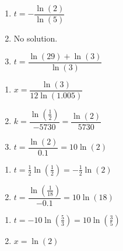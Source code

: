 \documentclass{ximera}
\begin{document}
\begin{multicols}{3}
\begin{enumerate}
\setcounter{enumi}{\value{HW}}

\item $t = -\dfrac{\ln(2)}{\ln(5)}$
\item No solution. 
\item $t = \dfrac{\ln(29) + \ln(3)}{\ln(3)}$

\setcounter{HW}{\value{enumi}}
\end{enumerate}
\end{multicols}

\begin{multicols}{3}
\begin{enumerate}
\setcounter{enumi}{\value{HW}}

\item $x = \dfrac{\ln(3)}{12\ln(1.005)}$ 
\item $k = \dfrac{\ln\left(\frac{1}{2}\right)}{-5730} = \dfrac{\ln(2)}{5730} $
\item $t=\dfrac{\ln(2)}{0.1} = 10\ln(2)$ 

\setcounter{HW}{\value{enumi}}
\end{enumerate}
\end{multicols}

\begin{multicols}{2}
\begin{enumerate}
\setcounter{enumi}{\value{HW}}


\item $t=\frac{1}{2}\ln\left(\frac{1}{2}\right) = -\frac{1}{2}\ln(2)$ 
\item $t = \dfrac{\ln\left(\frac{1}{18}\right)}{-0.1} =10 \ln(18)$

\setcounter{HW}{\value{enumi}}
\end{enumerate}
\end{multicols}

\begin{multicols}{2}
\begin{enumerate}
\setcounter{enumi}{\value{HW}}


\item $t=-10\ln\left(\frac{5}{3}\right) = 10\ln\left(\frac{3}{5}\right)$
\item$x=\ln(2)$ 

\setcounter{HW}{\value{enumi}}
\end{enumerate}
\end{multicols}
\end{document}
